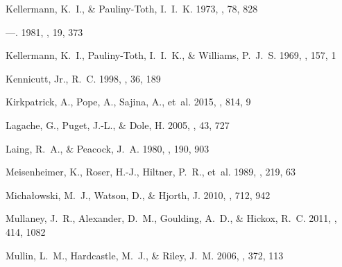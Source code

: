 \documentclass[iop, revtex4]{emulateapj}
\begin{document}
\begin{thebibliography}{}
{Kellermann}, K.~I., \& {Pauliny-Toth}, I.~I.~K. 1973, \aj, 78, 828

---. 1981, \araa, 19, 373

{Kellermann}, K.~I., {Pauliny-Toth}, I.~I.~K., \& {Williams}, P.~J.~S. 1969,
  \apj, 157, 1

{Kennicutt}, Jr., R.~C. 1998, \araa, 36, 189

{Kirkpatrick}, A., {Pope}, A., {Sajina}, A., {et~al.} 2015, \apj, 814, 9

{Lagache}, G., {Puget}, J.-L., \& {Dole}, H. 2005, \araa, 43, 727

{Laing}, R.~A., \& {Peacock}, J.~A. 1980, \mnras, 190, 903

{Meisenheimer}, K., {Roser}, H.-J., {Hiltner}, P.~R., {et~al.} 1989, \aap, 219,
  63

{Micha{\l}owski}, M.~J., {Watson}, D., \& {Hjorth}, J. 2010, \apj, 712, 942

{Mullaney}, J.~R., {Alexander}, D.~M., {Goulding}, A.~D., \& {Hickox}, R.~C.
  2011, \mnras, 414, 1082

{Mullin}, L.~M., {Hardcastle}, M.~J., \& {Riley}, J.~M. 2006, \mnras, 372, 113


\end{thebibliography}
\end{document}
